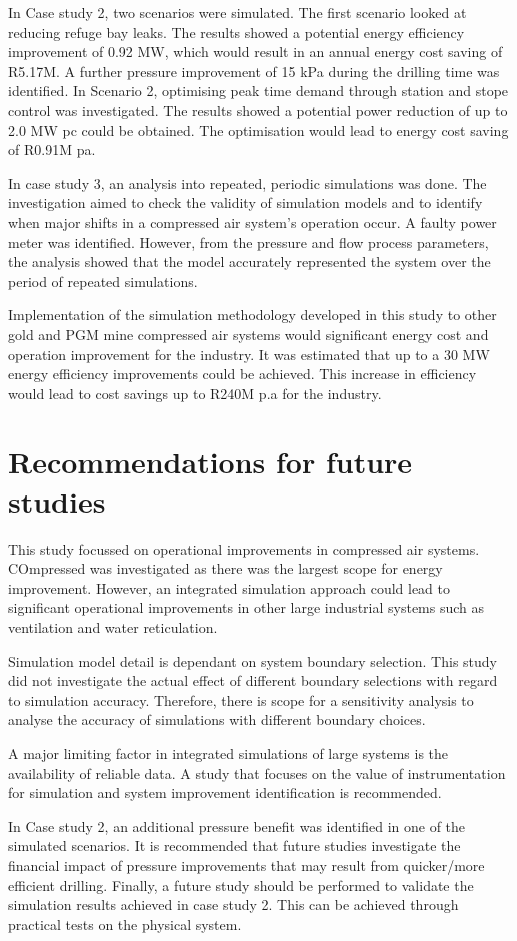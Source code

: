 	 \par
	 In Case study 2, two scenarios were simulated. The first scenario looked at reducing refuge bay leaks. The results showed a potential energy efficiency improvement of 0.92 MW, which would result in an annual energy cost saving of R5.17M. A further pressure improvement of 15 kPa during the drilling time was identified. In Scenario 2, optimising peak time demand through station and stope control was investigated. The results showed a potential power reduction of up to 2.0 MW \gls{pc} could be obtained. The optimisation would lead to energy cost saving of R0.91M \gls{pa}.
	 \par 
	 In case study 3, an analysis into repeated, periodic simulations was done. The investigation aimed to check the validity of simulation models and to identify when major shifts in a compressed air system’s operation occur. A faulty power meter was identified. However, from the pressure and flow process parameters, the analysis showed that the model accurately represented the system over the period of repeated simulations.
	 \par
	 Implementation of the simulation methodology developed in this study to other gold and PGM mine compressed air systems would significant energy cost and operation improvement for the industry. It was estimated that up to a 30 MW energy efficiency improvements could be achieved. This increase in efficiency would lead to cost savings up to R240M p.a for the industry. 
	 \section{Recommendations for future studies}
	 This study focussed on operational improvements in compressed air systems.  COmpressed was investigated as there was the largest scope for energy improvement. However, an integrated simulation approach could lead to significant operational improvements in other large industrial systems such as ventilation and water reticulation.
	 \par
	 Simulation model detail is dependant on system boundary selection. This study did not investigate the actual effect of different boundary selections with regard to simulation accuracy. Therefore, there is scope for a sensitivity analysis to analyse the accuracy of simulations with different boundary choices.
	 \par
	 A major limiting factor in integrated simulations of large systems is the availability of reliable data. A study that focuses on the value of instrumentation for simulation and system improvement identification is recommended.
	 \par 
	 In Case study 2, an additional pressure benefit was identified in one of the simulated scenarios. It is recommended that future studies investigate the financial impact of pressure improvements that may result from quicker/more efficient drilling. Finally, a future study should be performed to validate the simulation results achieved in case study 2. This can be achieved through practical tests on the physical system.
